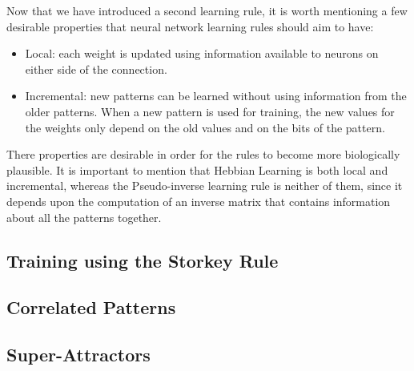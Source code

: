 Now that we have introduced a second learning rule, it is worth mentioning a few desirable properties that neural network learning rules should aim to have:
\begin{itemize}
 \item Local: each weight is updated using information available to neurons on either side of the connection. 
 \item Incremental: new patterns can be learned without using information from the older patterns. When a new pattern is used for training, the new values for the weights only depend on the old values and on the bits of the pattern.
\end{itemize}

There properties are desirable in order for the rules to become more biologically plausible. It is important to mention that Hebbian Learning is both local and incremental, whereas the Pseudo-inverse learning rule is neither of them, since it depends upon the computation of an inverse matrix that contains information about all the patterns together.

\subsection{Training using the Storkey Rule}

\subsection{Correlated Patterns}

\subsection{Super-Attractors}

